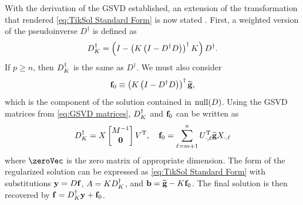 With the derivation of the GSVD established, an extension of the transformation that rendered \eqref{eq:TikSol Standard Form} is now stated \cite[p.~38]{Hansen:98}. First, a weighted version of the pseudoinverse $D^\dagger$ is defined as
\[D_{K}^\dagger = \left(I - \left(K\left(I - D^\dagger D\right)\right)^\dagger K\right)D^\dagger.\]
If $p \geq n$, then $D_{K}^\dagger$ is the same as $D^\dagger$. We must also consider
\[\mathbf{f}_0 \equiv \left(K\left(I - D^\dagger D\right)\right)^\dagger \widetilde{\mathbf{g}},\]
which is the component of the solution contained in $\operatorname{null}(D)$.  Using the GSVD matrices from \eqref{eq:GSVD matrices}, $D_{K}^\dagger$ and $\mathbf{f}_0$ can be written as
\begin{equation}
\label{eq:Trans. 1}
D_{K}^\dagger = X \begin{bmatrix}
M^{-1} \\
\mathbf{0}
\end{bmatrix}V^{\mathrm{T}}, \quad \mathbf{f}_0 = \sum_{\ell=m+1}^{n} U_{\cdot,\ell}^{\mathrm{T}}\widetilde{\mathbf{g}} X_{\cdot,\ell}
\end{equation}
where $\zeroVec$ is the zero matrix of appropriate dimension. The form of the regularized solution can be expressed as \eqref{eq:TikSol Standard Form} with substitutions $\mathbf{y} = D\mathbf{f}$, $A = K{D_{K}^\dagger}$, and $\mathbf{b} = \widetilde{\mathbf{g}} - K\mathbf{f}_0$. 
The final solution is then recovered by $\mathbf{f} = D_{K}^\dagger \mathbf{y} + \mathbf{f}_0$. 

